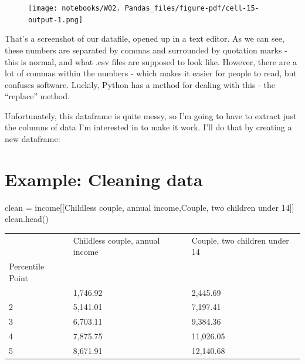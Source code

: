 \documentclass[
  letterpaper,
  DIV=11,
  numbers=noendperiod]{scrreprt}
\newenvironment{Shaded}{\begin{snugshade}}{\end{snugshade}}
\newcommand{\NormalTok}[1]{\textcolor[rgb]{0.00,0.23,0.31}{#1}}
\newcommand{\OperatorTok}[1]{\textcolor[rgb]{0.37,0.37,0.37}{#1}}
\newcommand{\StringTok}[1]{\textcolor[rgb]{0.13,0.47,0.30}{#1}}
\begin{document}
\begin{figure}[H]

{\centering \texttt{[image: notebooks/W02. Pandas\_files/figure-pdf/cell-15-output-1.png]}

}

\end{figure}

That's a screenshot of our datafile, opened up in a text editor. As we
can see, these numbers are separated by commas and surrounded by
quotation marks - this is normal, and what .csv files are supposed to
look like. However, there are a lot of commas within the numbers - which
makes it easier for people to read, but confuses software. Luckily,
Python has a method for dealing with this - the ``replace'' method.

Unfortunately, this dataframe is quite messy, so I'm going to have to
extract just the columns of data I'm interested in to make it work. I'll
do that by creating a new dataframe:

\hypertarget{example-cleaning-data}{%
\section{Example: Cleaning data}\label{example-cleaning-data}}

\begin{Shaded}
\begin{Highlighting}[]
\NormalTok{clean }\OperatorTok{=}\NormalTok{ income[[}\StringTok{\textquotesingle{}Childless couple, annual income\textquotesingle{}}\NormalTok{,}\StringTok{\textquotesingle{}Couple, two children under 14\textquotesingle{}}\NormalTok{]]}
\NormalTok{clean.head()}
\end{Highlighting}
\end{Shaded}

\begin{longtable}[]{@{}lll@{}}
\toprule\noalign{}
& Childless couple, annual income & Couple, two children under 14 \\
Percentile Point & & \\
\midrule\noalign{}
\endhead
\bottomrule\noalign{}
\endlastfoot
1 & 1,746.92 & 2,445.69 \\
2 & 5,141.01 & 7,197.41 \\
3 & 6,703.11 & 9,384.36 \\
4 & 7,875.75 & 11,026.05 \\
5 & 8,671.91 & 12,140.68 \\
\end{longtable}
\end{document}
